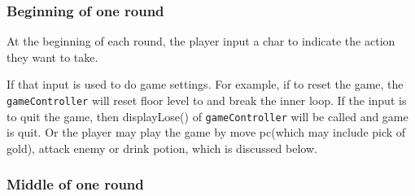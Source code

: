 \documentclass[11pt]{article}
\theoremstyle{plain} \newtheorem{theorem*}{Theorem}[subsection]
\begin{document}
\subsubsection{ Beginning of one round }

At the beginning of each round, the player input a char to indicate the 
action they want to take. 

If that input is used to do game settings. For example, if to reset the game,
the \texttt{gameController} will reset floor level to and break the inner
loop. If the input is to quit the game, then \textsf{displayLose()} of
\texttt{gameController} will be called and game is quit.
Or the player may play the game by move pc(which may include pick of gold),
attack enemy or drink potion, which is discussed below.


\subsubsection{Middle of one round}
\end{document}
